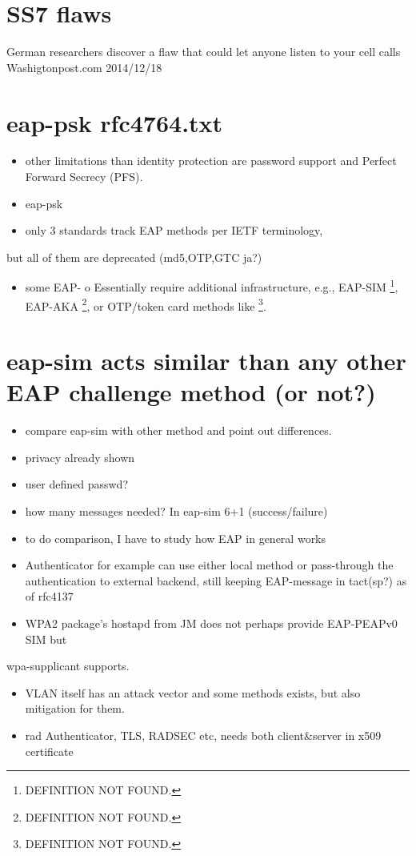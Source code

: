 \documentclass[12pt,a4paper,english]{tutthesis}
\begin{document}
\section{SS7 flaws}
\label{sec-8-3}
German researchers discover a flaw that could let anyone listen to
your cell calls 
Washigtonpost.com 2014/12/18
\section{eap-psk rfc4764.txt}
\label{sec-8-4}
\begin{itemize}
\item other limitations than identity protection are password support and Perfect Forward Secrecy (PFS).
\item eap-psk
\item only 3 standards track EAP methods per IETF terminology,
\end{itemize}
but all of them are deprecated (md5,OTP,GTC ja?)
\begin{itemize}
\item some EAP- o  Essentially require additional infrastructure, e.g., EAP-SIM \footnote{DEFINITION NOT FOUND.},
EAP-AKA \footnote{DEFINITION NOT FOUND.}, or OTP/token card methods like \footnote{DEFINITION NOT FOUND.}.
\end{itemize}


\section{eap-sim acts similar than any other EAP challenge method (or not?)}
\label{sec-8-5}
\begin{itemize}
\item compare eap-sim with other method and point out differences.
\item privacy already shown
\item user defined passwd?
\item how many messages needed? In eap-sim 6+1 (success/failure)
\item to do comparison, I have to study how EAP in general works
\item Authenticator for example can use either local method or
pass-through the authentication to external backend, still keeping
EAP-message in tact(sp?) as of  rfc4137
\item WPA2 package's hostapd from JM does not perhaps provide EAP-PEAPv0 SIM but
\end{itemize}
wpa-supplicant supports.
\begin{itemize}
\item VLAN itself has an attack vector and some methods exists, but also
mitigation for them.
\item rad Authenticator, TLS, RADSEC etc, needs both client\&server in
x509 certificate
\end{itemize}
\end{document}
